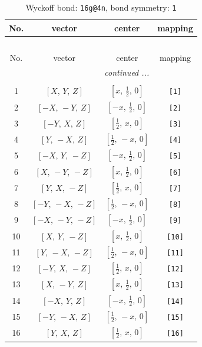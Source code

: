 \documentclass[fleqn,8pt]{jsarticle}
\begin{document}
\begin{longtable}{cccc}
\caption{Wyckoff bond: {\tt 16g@4n}, bond symmetry: {\tt 1}}
 \\
 \hline \hline
No. & vector & center & mapping \\ \hline \endfirsthead

\multicolumn{3}{l}{\tablename\ \thetable{}} \\
 \hline \hline
No. & vector & center & mapping \\ \hline \endhead

 \hline \hline
\multicolumn{3}{r}{\footnotesize\it continued ...} \\ \endfoot

 \hline \hline
\multicolumn{3}{r}{} \\ \endlastfoot

1 & $\left[ X,\, Y,\, Z \right]$ & $\left[ x,\, \frac{1}{2},\, 0 \right]$ & {\tt [1]} \\ \hline
2 & $\left[ - X,\, - Y,\, Z \right]$ & $\left[ - x,\, \frac{1}{2},\, 0 \right]$ & {\tt [2]} \\ \hline
3 & $\left[ - Y,\, X,\, Z \right]$ & $\left[ \frac{1}{2},\, x,\, 0 \right]$ & {\tt [3]} \\ \hline
4 & $\left[ Y,\, - X,\, Z \right]$ & $\left[ \frac{1}{2},\, - x,\, 0 \right]$ & {\tt [4]} \\ \hline
5 & $\left[ - X,\, Y,\, - Z \right]$ & $\left[ - x,\, \frac{1}{2},\, 0 \right]$ & {\tt [5]} \\ \hline
6 & $\left[ X,\, - Y,\, - Z \right]$ & $\left[ x,\, \frac{1}{2},\, 0 \right]$ & {\tt [6]} \\ \hline
7 & $\left[ Y,\, X,\, - Z \right]$ & $\left[ \frac{1}{2},\, x,\, 0 \right]$ & {\tt [7]} \\ \hline
8 & $\left[ - Y,\, - X,\, - Z \right]$ & $\left[ \frac{1}{2},\, - x,\, 0 \right]$ & {\tt [8]} \\ \hline
9 & $\left[ - X,\, - Y,\, - Z \right]$ & $\left[ - x,\, \frac{1}{2},\, 0 \right]$ & {\tt [9]} \\ \hline
10 & $\left[ X,\, Y,\, - Z \right]$ & $\left[ x,\, \frac{1}{2},\, 0 \right]$ & {\tt [10]} \\ \hline
11 & $\left[ Y,\, - X,\, - Z \right]$ & $\left[ \frac{1}{2},\, - x,\, 0 \right]$ & {\tt [11]} \\ \hline
12 & $\left[ - Y,\, X,\, - Z \right]$ & $\left[ \frac{1}{2},\, x,\, 0 \right]$ & {\tt [12]} \\ \hline
13 & $\left[ X,\, - Y,\, Z \right]$ & $\left[ x,\, \frac{1}{2},\, 0 \right]$ & {\tt [13]} \\ \hline
14 & $\left[ - X,\, Y,\, Z \right]$ & $\left[ - x,\, \frac{1}{2},\, 0 \right]$ & {\tt [14]} \\ \hline
15 & $\left[ - Y,\, - X,\, Z \right]$ & $\left[ \frac{1}{2},\, - x,\, 0 \right]$ & {\tt [15]} \\ \hline
16 & $\left[ Y,\, X,\, Z \right]$ & $\left[ \frac{1}{2},\, x,\, 0 \right]$ & {\tt [16]} \\
\end{longtable}
\end{document}

